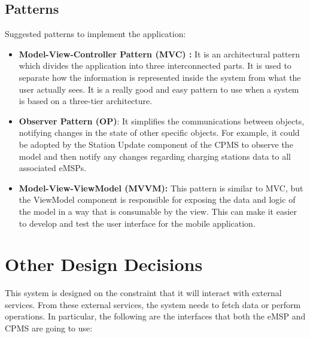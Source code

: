 \subsection{Patterns}
Suggested patterns to implement the application:
\begin{itemize}

\item \textbf{Model-View-Controller Pattern (MVC) : }It is an architectural pattern which divides
the application into three interconnected parts. It is used to separate how the information is represented inside the system from what the user actually sees. It is a really good and easy pattern to use when a system is based on a three-tier architecture.
\item \textbf{Observer Pattern (OP)}: It simplifies the communications between objects, notifying changes in the state of other specific objects. For example, it could be adopted by the Station Update component of the CPMS to observe the model and then notify any changes regarding charging stations data to all associated eMSPs.
\begin{comment}
\item \textbf {Service-Oriented Architecture (SOA): } This pattern involves building the system as a collection of independent, self-contained services that communicate with each other through APIs. This can make it easier to scale and maintain the system, as changes to one service do not necessarily affect the others.
\end{comment}
\item \textbf{Model-View-ViewModel (MVVM):} This pattern is similar to MVC, but the ViewModel component is responsible for exposing the data and logic of the model in a way that is consumable by the view. This can make it easier to develop and test the user interface for the mobile application.
\end{itemize}
\label{subsec:patterns}
\newpage
\section{Other Design Decisions}
This system is designed on the constraint that it will interact with external services. From these external services, the system needs to fetch data or perform operations. In particular, the following are the interfaces that both the eMSP and CPMS are going to use:

